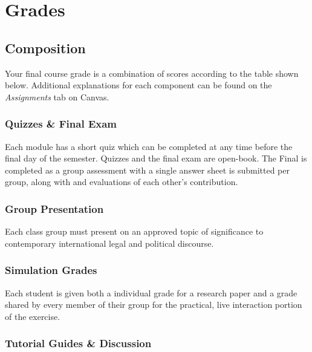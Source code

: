\documentclass[10pt,]{article}
\begin{document}
\newpage

\hypertarget{grades}{%
\section{Grades}\label{grades}}

\hypertarget{composition}{%
\subsection{Composition}\label{composition}}

Your final course grade is a combination of scores according to the
table shown below. Additional explanations for each component can be
found on the \emph{Assignments} tab on Canvas.

\hypertarget{quizzes-final-exam}{%
\subsubsection{Quizzes \& Final Exam}\label{quizzes-final-exam}}

Each module has a short quiz which can be completed at any time before
the final day of the semester. Quizzes and the final exam are open-book.
The Final is completed as a group assessment with a single answer sheet
is submitted per group, along with and evaluations of each other's
contribution.

\hypertarget{group-presentation}{%
\subsubsection{Group Presentation}\label{group-presentation}}

Each class group must present on an approved topic of significance to
contemporary international legal and political discourse.

\hypertarget{simulation-grades}{%
\subsubsection{Simulation Grades}\label{simulation-grades}}

Each student is given both a individual grade for a research paper and a
grade shared by every member of their group for the practical, live
interaction portion of the exercise.

\hypertarget{tutorial-guides-discussion}{%
\subsubsection{Tutorial Guides \&
Discussion}\label{tutorial-guides-discussion}}
\end{document}
